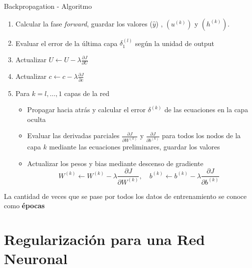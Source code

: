 \documentclass[handout, 9pt]{beamer}
\begin{document}
\begin{frame}{Backpropagation - Algoritmo}

\begin{enumerate}


  \item Calcular la fase \emph{forward}, guardar los valores ($\hat{y}$) , $(u^{(k)})$ y $(h^{(k)})$. \pause


  \item Evaluar el error de la última capa $\delta_1^{(l)}$ según la unidad de output \pause
  
  \item Actualizar $U \gets U - \lambda \frac{\partial J}{\partial U}$ \pause
  
  \item Actualizar $c \gets c - \lambda \frac{\partial J}{\partial c}$ \pause

  \item Para $k=l, \dots ,1$ capas de la red \pause

  \begin{itemize}
    \item Propagar hacia atrás y calcular el error $\delta^{(k)}$ de las ecuaciones en la capa oculta  \pause
    \item Evaluar las derivadas parciales $\frac{\partial J}{\partial W^{(k)}}$ y $\frac{\partial J}{\partial b^{(k)}}$ para todos los nodos de la capa $k$ mediante las ecuaciones preliminares, guardar los valores \pause


    \item Actualizar los pesos y bias mediante descenso de gradiente 
    \[
    W^{(k)} \gets W^{(k)} - \lambda \frac{\partial J}{\partial W^{(k)}}, \quad b^{(k)} \gets b^{(k)} - \lambda \frac{\partial J}{\partial b^{(k)}}
    \] \pause 

  \end{itemize}

\end{enumerate}

\begin{observacion}

 La cantidad de veces que se pase por todos los datos de entrenamiento se conoce como \textbf{épocas}

\end{observacion}

\end{frame}

\section{Regularización para una Red Neuronal}
\end{document}
